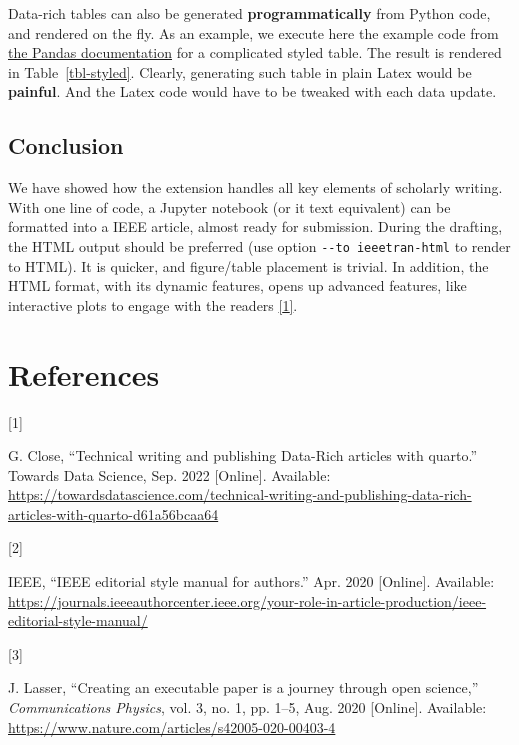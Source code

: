 \documentclass[letterpaper, 10 pt, journal, twoside]{IEEEtran}
\newlength{\cslhangindent}
\newlength{\csllabelwidth}
\newlength{\cslentryspacingunit} %
\newenvironment{CSLReferences}[2] %
 {%
  \setlength{\parindent}{0pt}
  \ifodd #1
  \let\oldpar\par
  \def\par{\hangindent=\cslhangindent\oldpar}
  \fi
  \setlength{\parskip}{#2\cslentryspacingunit}
 }%
 {}
\newcommand{\CSLLeftMargin}[1]{\parbox[t]{\csllabelwidth}{#1}}
\newcommand{\CSLRightInline}[1]{\parbox[t]{\linewidth - \csllabelwidth}{#1}\break}
\begin{document}
Data-rich tables can also be generated \textbf{programmatically} from
Python code, and rendered on the fly. As an example, we execute here the
example code from
\href{https://pandas.pydata.org/docs/reference/api/pandas.io.formats.style.Styler.to_latex.html\#pandas.io.formats.style.Styler.to_latex}{the
Pandas documentation} for a complicated styled table. The result is
rendered in Table~\ref{tbl-styled}. Clearly, generating such table in
plain Latex would be \textbf{painful}. And the Latex code would have to
be tweaked with each data update.

\hypertarget{conclusion}{%
\subsection{Conclusion}\label{conclusion}}

We have showed how the extension handles all key elements of scholarly
writing. With one line of code, a Jupyter notebook (or it text
equivalent) can be formatted into a IEEE article, almost ready for
submission. During the drafting, the HTML output should be preferred
(use option \texttt{-\/-to\ ieeetran-html} to render to HTML). It is
quicker, and figure/table placement is trivial. In addition, the HTML
format, with its dynamic features, opens up advanced features, like
interactive plots to engage with the readers
\protect\hyperlink{ref-Close2022-dt}{{[}1{]}}.

\hypertarget{bibliography}{%
\section*{References}\label{bibliography}}

\hypertarget{refs}{}
\begin{CSLReferences}{0}{0}
\leavevmode{}%
\CSLLeftMargin{{[}1{]} }%
\CSLRightInline{G. Close, {``Technical writing and publishing
{Data-Rich} articles with quarto.''} Towards Data Science, Sep. 2022
{[}Online{]}. Available:
\url{https://towardsdatascience.com/technical-writing-and-publishing-data-rich-articles-with-quarto-d61a56bcaa64}}

\leavevmode{}%
\CSLLeftMargin{{[}2{]} }%
\CSLRightInline{IEEE, {``{IEEE} editorial style manual for authors.''}
Apr. 2020 {[}Online{]}. Available:
\url{https://journals.ieeeauthorcenter.ieee.org/your-role-in-article-production/ieee-editorial-style-manual/}}

\leavevmode{}%
\CSLLeftMargin{{[}3{]} }%
\CSLRightInline{J. Lasser, {``Creating an executable paper is a journey
through open science,''} \emph{Communications Physics}, vol. 3, no. 1,
pp. 1--5, Aug. 2020 {[}Online{]}. Available:
\url{https://www.nature.com/articles/s42005-020-00403-4}}

\end{CSLReferences}

\end{document}
